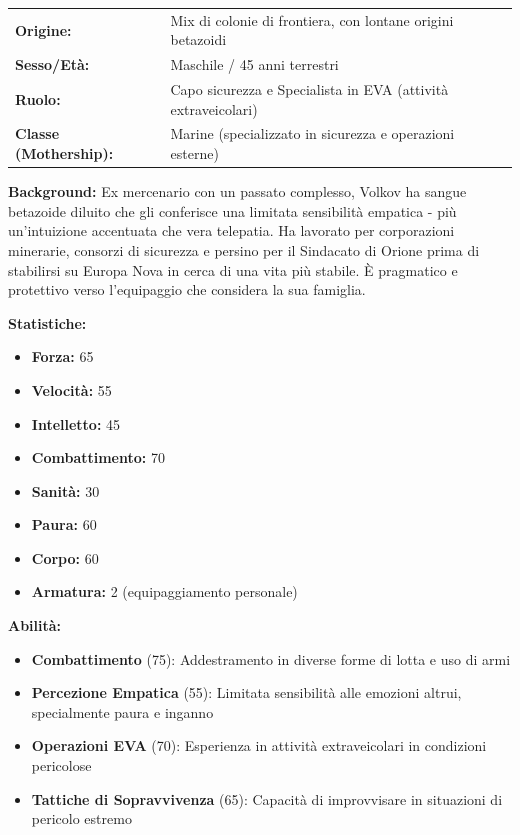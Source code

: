 \documentclass[11pt,a4paper]{article}
\begin{document}
\begin{tcolorbox}[colback=mininglightorange!20, colframe=miningorange]
\begin{tabularx}{\textwidth}{lX}
\textbf{Origine:} & Mix di colonie di frontiera, con lontane origini betazoidi \\
\textbf{Sesso/Età:} & Maschile / 45 anni terrestri \\
\textbf{Ruolo:} & Capo sicurezza e Specialista in EVA (attività extraveicolari) \\
\textbf{Classe (Mothership):} & Marine (specializzato in sicurezza e operazioni esterne) \\
\end{tabularx}

\textbf{Background:} Ex mercenario con un passato complesso, Volkov ha sangue betazoide diluito che gli conferisce una limitata sensibilità empatica - più un'intuizione accentuata che vera telepatia. Ha lavorato per corporazioni minerarie, consorzi di sicurezza e persino per il Sindacato di Orione prima di stabilirsi su Europa Nova in cerca di una vita più stabile. È pragmatico e protettivo verso l'equipaggio che considera la sua famiglia.

\textbf{Statistiche:}
\begin{itemize}[leftmargin=*]
\item \textbf{Forza:} 65
\item \textbf{Velocità:} 55
\item \textbf{Intelletto:} 45
\item \textbf{Combattimento:} 70
\item \textbf{Sanità:} 30
\item \textbf{Paura:} 60
\item \textbf{Corpo:} 60
\item \textbf{Armatura:} 2 (equipaggiamento personale)
\end{itemize}

\textbf{Abilità:}
\begin{itemize}[leftmargin=*]
\item \textbf{Combattimento} (75): Addestramento in diverse forme di lotta e uso di armi
\item \textbf{Percezione Empatica} (55): Limitata sensibilità alle emozioni altrui, specialmente paura e inganno
\item \textbf{Operazioni EVA} (70): Esperienza in attività extraveicolari in condizioni pericolose
\item \textbf{Tattiche di Sopravvivenza} (65): Capacità di improvvisare in situazioni di pericolo estremo
\end{itemize}


\end{tcolorbox}
\end{document}
